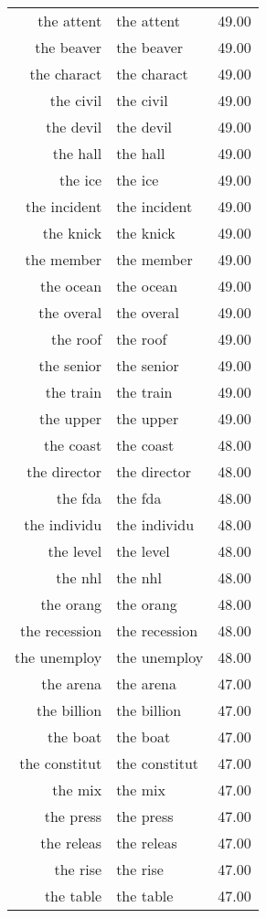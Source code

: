\begin{table}[ht]
\begin{tabular}{rlr}
  the attent & the attent & 49.00 \\ 
  the beaver & the beaver & 49.00 \\ 
  the charact & the charact & 49.00 \\ 
  the civil & the civil & 49.00 \\ 
  the devil & the devil & 49.00 \\ 
  the hall & the hall & 49.00 \\ 
  the ice & the ice & 49.00 \\ 
  the incident & the incident & 49.00 \\ 
  the knick & the knick & 49.00 \\ 
  the member & the member & 49.00 \\ 
  the ocean & the ocean & 49.00 \\ 
  the overal & the overal & 49.00 \\ 
  the roof & the roof & 49.00 \\ 
  the senior & the senior & 49.00 \\ 
  the train & the train & 49.00 \\ 
  the upper & the upper & 49.00 \\ 
  the coast & the coast & 48.00 \\ 
  the director & the director & 48.00 \\ 
  the fda & the fda & 48.00 \\ 
  the individu & the individu & 48.00 \\ 
  the level & the level & 48.00 \\ 
  the nhl & the nhl & 48.00 \\ 
  the orang & the orang & 48.00 \\ 
  the recession & the recession & 48.00 \\ 
  the unemploy & the unemploy & 48.00 \\ 
  the arena & the arena & 47.00 \\ 
  the billion & the billion & 47.00 \\ 
  the boat & the boat & 47.00 \\ 
  the constitut & the constitut & 47.00 \\ 
  the mix & the mix & 47.00 \\ 
  the press & the press & 47.00 \\ 
  the releas & the releas & 47.00 \\ 
  the rise & the rise & 47.00 \\ 
  the table & the table & 47.00 \\ 

\end{tabular}
\end{table}
